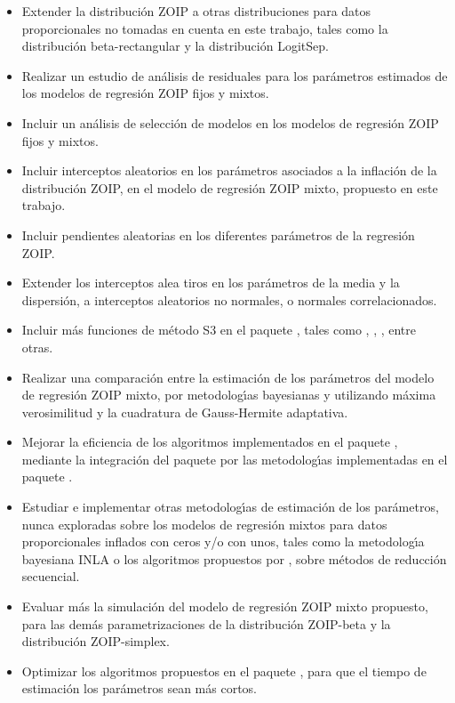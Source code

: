\begin{itemize}
	\item Extender la distribuci\'{o}n ZOIP a otras distribuciones para datos proporcionales no tomadas en cuenta en este trabajo, tales como la distribuci\'{o}n beta-rectangular y la distribuci\'{o}n LogitSep.
	\item Realizar un estudio de an\'{a}lisis de residuales para los par\'{a}metros estimados de los modelos de regresi\'{o}n ZOIP fijos y mixtos.
	\item Incluir un an\'{a}lisis de selecci\'{o}n de modelos en los modelos de regresi\'{o}n ZOIP fijos y mixtos.
	\item Incluir interceptos aleatorios en los par\'{a}metros asociados a la inflaci\'{o}n de la distribuci\'{o}n ZOIP, en el modelo de regresi\'{o}n ZOIP mixto, propuesto en este trabajo.
\item Incluir pendientes aleatorias en los diferentes par\'{a}metros de la regresi\'{o}n ZOIP.
	\item Extender los interceptos alea tiros en los par\'{a}metros de la media y la dispersi\'{o}n, a interceptos aleatorios no normales, o normales correlacionados.
	\item Incluir m\'{a}s funciones de m\'{e}todo S3 en el paquete , tales como ,  , , entre otras.
	\item Realizar una comparaci\'{o}n entre la estimaci\'{o}n de los par\'{a}metros del modelo de regresi\'{o}n ZOIP mixto, por metodolog\'{\i}as bayesianas y utilizando m\'{a}xima verosimilitud y la cuadratura de Gauss-Hermite adaptativa.
		\item Mejorar la eficiencia de los algoritmos implementados en el paquete , mediante la integraci\'{o}n del paquete  por las metodolog\'{\i}as implementadas en el paquete .
	\item Estudiar e implementar otras metodolog\'{\i}as de estimaci\'{o}n de los par\'{a}metros, nunca exploradas sobre los modelos de regresi\'{o}n mixtos para datos proporcionales inflados con ceros y/o con unos, tales como la metodolog\'{\i}a bayesiana INLA o los algoritmos propuestos por \cite{Ogden1}, sobre m\'{e}todos de reducci\'{o}n secuencial. 
	\item Evaluar m\'{a}s la simulaci\'{o}n del modelo de regresi\'{o}n ZOIP mixto propuesto, para las dem\'{a}s parametrizaciones de la distribuci\'{o}n ZOIP-beta y la distribuci\'{o}n ZOIP-simplex.
	\item Optimizar los algoritmos propuestos en el paquete , para que el tiempo de estimaci\'{o}n los par\'{a}metros sean m\'{a}s cortos.

\end{itemize}
